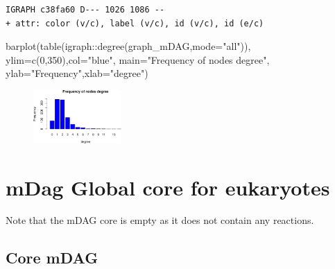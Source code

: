 \documentclass[
  letterpaper,
  DIV=11,
  numbers=noendperiod]{scrreprt}
\newenvironment{Shaded}{\begin{snugshade}}{\end{snugshade}}
\newcommand{\AttributeTok}[1]{\textcolor[rgb]{0.40,0.45,0.13}{#1}}
\newcommand{\DecValTok}[1]{\textcolor[rgb]{0.68,0.00,0.00}{#1}}
\newcommand{\FunctionTok}[1]{\textcolor[rgb]{0.28,0.35,0.67}{#1}}
\newcommand{\NormalTok}[1]{\textcolor[rgb]{0.00,0.23,0.31}{#1}}
\newcommand{\SpecialCharTok}[1]{\textcolor[rgb]{0.37,0.37,0.37}{#1}}
\newcommand{\StringTok}[1]{\textcolor[rgb]{0.13,0.47,0.30}{#1}}
\begin{document}
\begin{verbatim}
IGRAPH c38fa60 D--- 1026 1086 -- 
+ attr: color (v/c), label (v/c), id (v/c), id (e/c)
\end{verbatim}

\begin{Shaded}
\begin{Highlighting}[]
\FunctionTok{barplot}\NormalTok{(}\FunctionTok{table}\NormalTok{(igraph}\SpecialCharTok{::}\FunctionTok{degree}\NormalTok{(graph\_mDAG,}\AttributeTok{mode=}\StringTok{"all"}\NormalTok{)),}
              \AttributeTok{ylim=}\FunctionTok{c}\NormalTok{(}\DecValTok{0}\NormalTok{,}\DecValTok{350}\NormalTok{),}\AttributeTok{col=}\StringTok{"blue"}\NormalTok{,}
              \AttributeTok{main=}\StringTok{"Frequency of nodes degree"}\NormalTok{,}
              \AttributeTok{ylab=}\StringTok{"Frequency"}\NormalTok{,}\AttributeTok{xlab=}\StringTok{"degree"}\NormalTok{)}
\end{Highlighting}
\end{Shaded}

\begin{figure}[H]

{\centering \includegraphics[width=0.3\textwidth,height=\textheight]{index_files/figure-pdf/unnamed-chunk-15-1.pdf}

}

\end{figure}

\hypertarget{mdag-global-core-for-eukaryotes}{%
\section*{mDag Global core for
eukaryotes}\label{mdag-global-core-for-eukaryotes}}


Note that the mDAG core is empty as it does not contain any reactions.

\hypertarget{core-mdag}{%
\subsection*{Core mDAG}\label{core-mdag}}
\end{document}
